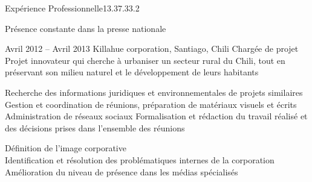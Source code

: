 \documentclass[30pt, french]{tccv}
\begin{document}
\begin{upshape}
\begin{flat_frame}{Expérience Professionnelle}{13.3}{7.3}{3.2}{}
\begin{eventlist}
\begin{itemize}
\end{itemize}       
 Présence constante dans la presse nationale
\vspace{0.5cm}




\setlength{\parskip}{0pt}
\item{Avril 2012 -- Avril 2013 }     
  {Killahue corporation, Santiago, Chili}     
  {Chargée de projet}
\fontsize{9pt}{1em}\color{text}\bodyfontlight\upshape\selectfont
%
 Projet innovateur qui cherche à urbaniser un secteur rural du Chili, tout en préservant son milieu naturel et le développement de leurs habitants \\
     
\setlength{\parskip}{-10pt}
\begin{itemize}
      \setlength\itemsep{-3pt} 
      \cvitem[\checkmark] Recherche des informations juridiques et environnementales de projets similaires          
      \cvitem[\checkmark] Gestion et coordination de réunions, préparation de matériaux visuels et écrits   
      \cvitem[\checkmark] Administration de réseaux sociaux                                                                    
      \cvitem[\checkmark] Formalisation et rédaction du travail réalisé et des décisions prises dans l’ensemble des réunions     
\end{itemize}      

  Définition de l’image corporative \\
\mission{}            Identification et résolution des problématiques internes de la corporation \\
\mission{} 	      Amélioration du niveau de présence dans les médias spécialisés \\


  
       

   

\end{eventlist}
\end{flat_frame}







\end{upshape}
\end{document}
